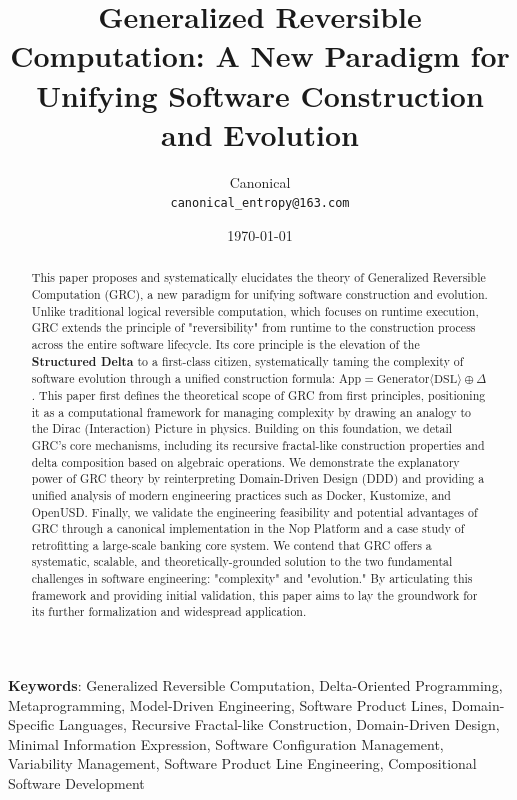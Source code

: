 \documentclass[11pt]{article}
\begin{document}
\title{\textbf{Generalized Reversible Computation: A New Paradigm for Unifying Software Construction and Evolution}}
\author{Canonical \\ \texttt{canonical\_entropy@163.com}}
\date{\today}

\maketitle

\begin{abstract}
This paper proposes and systematically elucidates the theory of Generalized Reversible Computation (GRC), a new paradigm for unifying software construction and evolution. Unlike traditional logical reversible computation, which focuses on runtime execution, GRC extends the principle of "reversibility" from runtime to the construction process across the entire software lifecycle. Its core principle is the elevation of the \textbf{Structured Delta} to a first-class citizen, systematically taming the complexity of software evolution through a unified construction formula: $\text{App} = \text{Generator}\langle\text{DSL}\rangle \oplus \Delta$. This paper first defines the theoretical scope of GRC from first principles, positioning it as a computational framework for managing complexity by drawing an analogy to the Dirac (Interaction) Picture in physics. Building on this foundation, we detail GRC's core mechanisms, including its recursive fractal-like construction properties and delta composition based on algebraic operations. We demonstrate the explanatory power of GRC theory by reinterpreting Domain-Driven Design (DDD) and providing a unified analysis of modern engineering practices such as Docker, Kustomize, and OpenUSD. Finally, we validate the engineering feasibility and potential advantages of GRC through a canonical implementation in the Nop Platform and a case study of retrofitting a large-scale banking core system. We contend that GRC offers a systematic, scalable, and theoretically-grounded solution to the two fundamental challenges in software engineering: "complexity" and "evolution." By articulating this framework and providing initial validation, this paper aims to lay the groundwork for its further formalization and widespread application. 
\end{abstract}

\vspace{1em}
\noindent\textbf{Keywords}: Generalized Reversible Computation, Delta-Oriented Programming, Metaprogramming, Model-Driven Engineering, Software Product Lines, Domain-Specific Languages, Recursive Fractal-like Construction, Domain-Driven Design, Minimal Information Expression, Software Configuration Management, Variability Management, Software Product Line Engineering, Compositional Software Development
\end{document}
